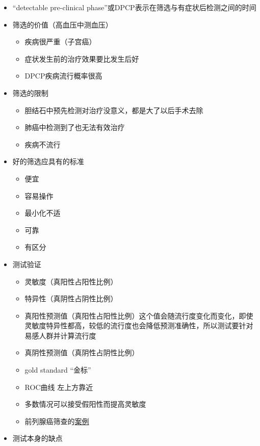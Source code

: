 \documentclass[]{book}
\providecommand{\tightlist}{%
  \setlength{\itemsep}{0pt}\setlength{\parskip}{0pt}}
\begin{document}
\begin{itemize}
\tightlist
\item
  ``detectable pre-clinical phase''或DPCP表示在筛选与有症状后检测之间的时间
\item
  筛选的价值（高血压中测血压）

  \begin{itemize}
  \tightlist
  \item
    疾病很严重（子宫癌）
  \item
    症状发生前的治疗效果要比发生后好
  \item
    DPCP疾病流行概率很高
  \end{itemize}
\item
  筛选的限制

  \begin{itemize}
  \tightlist
  \item
    胆结石中预先检测对治疗没意义，都是大了以后手术去除
  \item
    肺癌中检测到了也无法有效治疗
  \item
    疾病不流行
  \end{itemize}
\item
  好的筛选应具有的标准

  \begin{itemize}
  \tightlist
  \item
    便宜
  \item
    容易操作
  \item
    最小化不适
  \item
    可靠
  \item
    有区分
  \end{itemize}
\item
  测试验证

  \begin{itemize}
  \tightlist
  \item
    灵敏度（真阳性占阳性比例）
  \item
    特异性（真阴性占阴性比例）
  \item
    真阳性预测值（真阳性占阳性比例）这个值会随流行度变化而变化，即使灵敏度特异性都高，较低的流行度也会降低预测准确性，所以测试要针对易感人群并计算流行度
  \item
    真阴性预测值（真阴性占阴性比例）
  \item
    gold standard ``金标''
  \item
    ROC曲线 左上方靠近
  \item
    多数情况可以接受假阳性而提高灵敏度
  \item
    前列腺癌筛查的\href{http://www.ncbi.nlm.nih.gov/pmc/articles/PMC137591/pdf/1471-2296-3-19.pdf}{案例}
  \end{itemize}
\item
  测试本身的缺点


\end{itemize}
\end{document}
